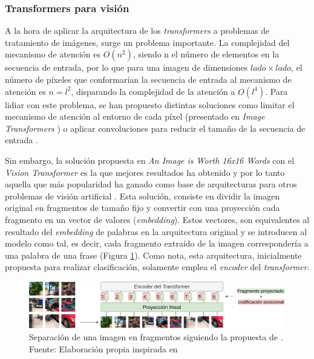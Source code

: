 \documentclass[a4paper, 11pt]{article}
\begin{document}
\subsubsection{Transformers para visión}

A la hora de aplicar la arquitectura de los \textit{transformers} a problemas de tratamiento de imágenes, surge un problema importante. La complejidad del mecanismo de atención es $O(n^{2})$, siendo n el número de elementos en la secuencia de entrada, por lo que para una imagen de dimensiones $lado \times lado$, el número de píxeles que conformarían la secuencia de entrada al mecanismo de atención es $n = l^2$, disparando la complejidad de la atención a $O(l^{4})$. Para lidiar con este problema, se han propuesto distintas soluciones como limitar el mecanismo de atención al entorno de cada píxel (presentado en \textit{Image Transformers} \cite{image_transformer}) o aplicar convoluciones para reducir el tamaño de la secuencia de entrada \cite{detrfacebookdetectiontransformers}. 

Sin embargo, la solución propuesta en \textit{An Image is Worth 16x16 Words} con el \textit{Vision Transformer} \cite{image16x16words} es la que mejores resultados ha obtenido y por lo tanto aquella que más popularidad ha ganado como base de arquitecturas para otros problemas de visión artificial \cite{visiontransformersDPT, bhat2020adabins, chen2021transunet, liu2021Swin}. Esta solución, consiste en dividir la imagen original en fragmentos de tamaño fijo y convertir con una proyección cada fragmento en un vector de valores (\textit{embedding}). Estos vectores, son equivalentes al resultado del \textit{embedding} de palabras en la arquitectura original y se introducen al modelo como tal, es decir, cada fragmento extraído de la imagen correspondería a una palabra de una frase (Figura \ref{fig:vision-transformer}). Como nota, esta arquitectura, inicialmente propuesta para realizar clasificación, solamente emplea el \textit{encoder} del \textit{transformer}.

\begin{figure}[H]
\centering
\includegraphics[width=1\linewidth]{imagenes/vision-transformer.png} 
\captionsetup{width=.8\linewidth}
\caption{Separación de una imagen en fragmentos siguiendo la propuesta de \cite{image16x16words}. Fuente: Elaboración propia inspirada en \cite{image16x16words}}
\label{fig:vision-transformer}
\end{figure}
\end{document}
